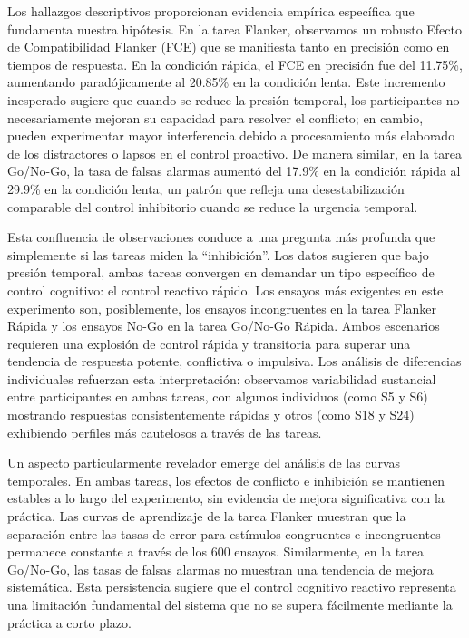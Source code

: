 \documentclass[
  spanish,
  10pt,
]{article}
\begin{document}
Los hallazgos descriptivos proporcionan evidencia empírica específica
que fundamenta nuestra hipótesis. En la tarea Flanker, observamos un
robusto Efecto de Compatibilidad Flanker (FCE) que se manifiesta tanto
en precisión como en tiempos de respuesta. En la condición rápida, el
FCE en precisión fue del 11.75\%, aumentando paradójicamente al 20.85\%
en la condición lenta. Este incremento inesperado sugiere que cuando se
reduce la presión temporal, los participantes no necesariamente mejoran
su capacidad para resolver el conflicto; en cambio, pueden experimentar
mayor interferencia debido a procesamiento más elaborado de los
distractores o lapsos en el control proactivo. De manera similar, en la
tarea Go/No-Go, la tasa de falsas alarmas aumentó del 17.9\% en la
condición rápida al 29.9\% en la condición lenta, un patrón que refleja
una desestabilización comparable del control inhibitorio cuando se
reduce la urgencia temporal.

Esta confluencia de observaciones conduce a una pregunta más profunda
que simplemente si las tareas miden la ``inhibición''. Los datos
sugieren que bajo presión temporal, ambas tareas convergen en demandar
un tipo específico de control cognitivo: el control reactivo rápido. Los
ensayos más exigentes en este experimento son, posiblemente, los ensayos
incongruentes en la tarea Flanker Rápida y los ensayos No-Go en la tarea
Go/No-Go Rápida. Ambos escenarios requieren una explosión de control
rápida y transitoria para superar una tendencia de respuesta potente,
conflictiva o impulsiva. Los análisis de diferencias individuales
refuerzan esta interpretación: observamos variabilidad sustancial entre
participantes en ambas tareas, con algunos individuos (como S5 y S6)
mostrando respuestas consistentemente rápidas y otros (como S18 y S24)
exhibiendo perfiles más cautelosos a través de las tareas.

Un aspecto particularmente revelador emerge del análisis de las curvas
temporales. En ambas tareas, los efectos de conflicto e inhibición se
mantienen estables a lo largo del experimento, sin evidencia de mejora
significativa con la práctica. Las curvas de aprendizaje de la tarea
Flanker muestran que la separación entre las tasas de error para
estímulos congruentes e incongruentes permanece constante a través de
los 600 ensayos. Similarmente, en la tarea Go/No-Go, las tasas de falsas
alarmas no muestran una tendencia de mejora sistemática. Esta
persistencia sugiere que el control cognitivo reactivo representa una
limitación fundamental del sistema que no se supera fácilmente mediante
la práctica a corto plazo.
\end{document}
